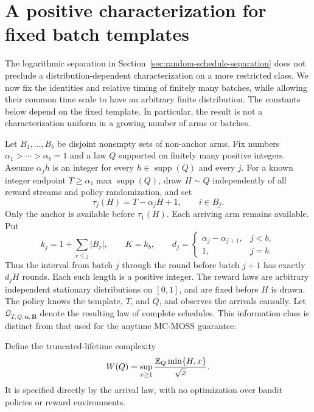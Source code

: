 \section{A positive characterization for fixed batch templates}
\label{sec:random-positive-proofs}

The logarithmic separation in Section~\ref{sec:random-schedule-separation}
does not preclude a distribution-dependent characterization on a more
restricted class. We now fix the identities and relative timing of
finitely many batches, while allowing their common time scale to have
an arbitrary finite distribution. The constants below depend on the
fixed template. In particular, the result is not a characterization
uniform in a growing number of arms or batches.

Let $B_1,\ldots,B_b$ be disjoint nonempty sets of non-anchor arms. Fix
numbers $\alpha_1>\cdots>\alpha_b=1$ and a law $Q$ supported on finitely
many positive integers. Assume $\alpha_j h$ is an integer for every
$h\in\operatorname{supp}(Q)$ and every $j$. For a known integer endpoint
$T\ge\alpha_1\max\operatorname{supp}(Q)$, draw $H\sim Q$ independently
of all reward streams and policy randomization, and set
\begin{equation}
 \tau_j(H)=T-\alpha_jH+1,\qquad i\in B_j.
 \label{eq:stretch-arrivals}
\end{equation}
Only the anchor is available before $\tau_1(H)$. Each arriving arm
remains available. Put
\[
 k_j=1+\sum_{r\le j}|B_r|,\qquad K=k_b,\qquad
 d_j=\begin{cases}\alpha_j-\alpha_{j+1},&j<b,\\1,&j=b.\end{cases}
\]
Thus the interval from batch $j$ through the round before batch $j+1$
has exactly $d_jH$ rounds. Each such length is a positive integer.
The reward laws are arbitrary independent stationary distributions on
$[0,1]$, and are fixed before $H$ is drawn. The policy knows the
template, $T$, and $Q$, and observes the arrivals causally. Let
$\mathcal Q_{T,Q,\boldsymbol\alpha,\boldsymbol B}$ denote the resulting
law of complete schedules. This information class is distinct from
that used for the anytime MC-MOSS guarantee.

Define the truncated-lifetime complexity
\begin{equation}
 W(Q)=\sup_{x\ge1}\frac{\mathbb E_Q\min\{H,x\}}{\sqrt{x}}.
 \label{eq:stretch-complexity}
\end{equation}
It is specified directly by the arrival law, with no optimization over
bandit policies or reward environments.


